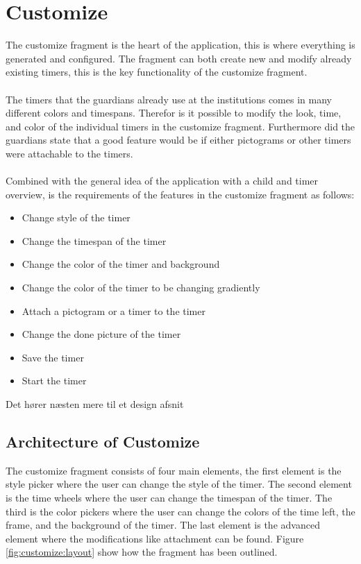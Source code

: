 \section{Customize}
The customize fragment is the heart of the application, this is where everything is generated and configured.
The fragment can both create new and modify already existing timers, this is the key functionality of the customize fragment.\\
\\
The timers that the guardians already use at the institutions comes in many different colors and timespans.
Therefor is it possible to modify the look, time, and color of the individual timers in the customize fragment.
Furthermore did the guardians state that a good feature would be if either pictograms or other timers were attachable to the timers.\\
\\
Combined with the general idea of the application with a child and timer overview, is the requirements of the features in the customize fragment as follows:\\

\begin{itemize}
	\item Change style of the timer
	\item Change the timespan of the timer
	\item Change the color of the timer and background
	\item Change the color of the timer to be changing gradiently
	\item Attach a pictogram or a timer to the timer
	\item Change the done picture of the timer
	\item Save the timer
	\item Start the timer
\end{itemize}

\color[rgb]{1,0,0} Det hører næsten mere til et design afsnit \color[rgb]{0,0,0}

\subsection{Architecture of Customize}
The customize fragment consists of four main elements, the first element is the style picker where the user can change the style of the timer.
The second element is the time wheels where the user can change the timespan of the timer.
The third is the color pickers where the user can change the colors of the time left, the frame, and the background of the timer.
The last element is the advanced element where the modifications like attachment can be found.
Figure \ref{fig:customize:layout} show how the fragment has been outlined.

